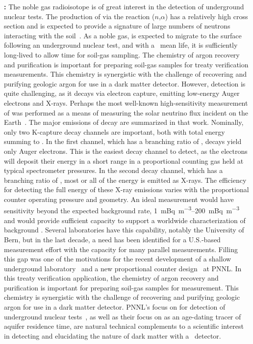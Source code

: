 \begin{asparaenum}
\item[\bf \ce{^37Ar}:] The noble gas radioisotope  is of great interest in the detection of underground nuclear tests.  The production of  via the reaction ($n$,$\alpha$) has a relatively high cross section and is expected to provide a signature of large numbers of neutrons interacting with the soil~\cite{Riedmann:2011ht}.  As a noble gas,  is expected to migrate to the surface following an underground nuclear test, and with a \ArThreeSevenMeanLife\ mean life, it is sufficiently long-lived to allow time for soil-gas sampling. The chemistry of argon recovery and purification is important for preparing soil-gas samples for treaty verification measurements. This chemistry is synergistic with the challenge of recovering and purifying geologic argon for use in a dark matter detector.  However,  detection is quite challenging, as it decays via electron capture, emitting low-energy Auger electrons and X-rays.  Perhaps the most well-known high-sensitivity measurement of  was performed as a means of measuring the solar neutrino flux incident on the Earth~\cite{Cleveland:1998er}.  The major emissions of  decay are summarized in that work.  Nominally, only two K-capture decay channels are important, both with total energy summing to \ArThreeSevenKCaptureXRaysEnergy.  In the first channel, which has a branching ratio of \ArThreeSevenKOneBR, decays yield only Auger electrons.  This is the easiest decay channel to detect, as the electrons will deposit their energy in a short range in a proportional counting gas held at typical spectrometer pressures.  In the second decay channel, which has a branching ratio of \ArThreeSevenKTwoToFourBR, most or all of the energy is emitted as X-rays.  The efficiency for detecting the full energy of these X-ray emissions varies with the proportional counter operating pressure and geometry. An ideal  measurement would have sensitivity beyond the expected  background rate, \SIrange{1}{200}{\milli\becquerel\per\cubic\meter}~\cite{Riedmann:2011ht} and would provide sufficient capacity to support a worldwide characterization of background .  Several laboratories  have this capability, notably the University of Bern, but in the last decade, a need has been identified for a U.S.-based  measurement effort with the capacity for many parallel measurements.  Filling this gap was one of the motivations for the recent development of a shallow underground laboratory~\cite{Aalseth:2012jl} and a new proportional counter design~\cite{Aalseth:2013cg} at PNNL.  In this treaty verification application, the chemistry of argon recovery and purification is important for preparing soil-gas samples for measurement.  This chemistry is synergistic with the challenge of recovering and purifying geologic argon for use in a dark matter detector.  PNNL's focus on  for detection of underground nuclear tests~\cite{Aalseth:2013cg}, as well as their focus on  as an age-dating tracer of aquifer residence time, are natural technical complements to a scientific interest in detecting and elucidating the nature of dark matter with a \LAr\ detector.


\end{asparaenum}
